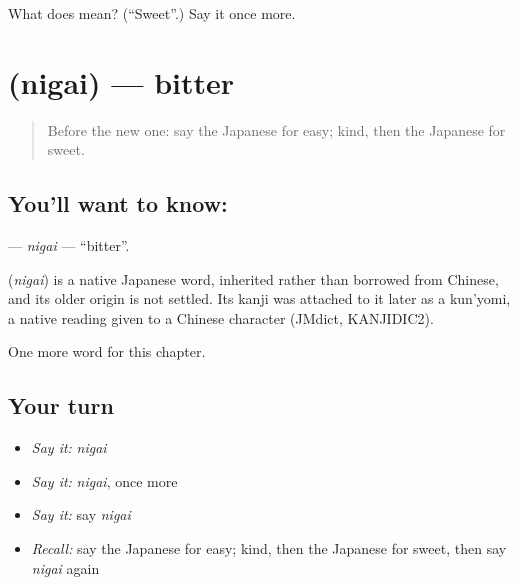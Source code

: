 \begin{tcolorbox}[breakable,colback=teal!4,colframe=teal!35!black,title={Before you move on}]
What does  mean? (\textquotedblleft{}Sweet\textquotedblright{}.) Say it once more.
\end{tcolorbox}
\section[\texorpdfstring{\ja{にがい} (nigai)}{にがい (nigai)}]{ (nigai) — bitter}

\label{lesson:JA-C50-nigai}



\begin{quote}
Before the new one: say the Japanese for easy; kind, then the Japanese for sweet.
\end{quote}

\subsection*{You'll want to know: }
\textbf{} — \emph{nigai} — \textquotedblleft{}bitter\textquotedblright{}.

\begin{cousinweb}
\textbf{} (\emph{nigai}) is a native Japanese word, inherited rather than borrowed from Chinese, and its older origin is not settled. Its kanji was attached to it later as a kun'yomi, a native reading given to a Chinese character (JMdict, KANJIDIC2).
\end{cousinweb}

\begin{grammarlens}[title={What you've built}]
One more word for this chapter.
\end{grammarlens}

\subsection*{Your turn}
\begin{itemize}
\raggedright
  \item \emph{Say it:} \emph{nigai}
  \item \emph{Say it:} \emph{nigai}, once more
  \item \emph{Say it:} say \emph{nigai}
  \item \emph{Recall:} say the Japanese for easy; kind, then the Japanese for sweet, then say \emph{nigai} again
\end{itemize}

